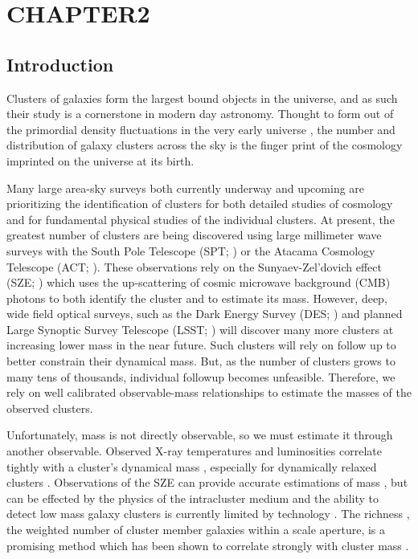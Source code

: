 \renewcommand*{\thefootnote}{\fnsymbol{footnote}}
\chapter[Chapter2]{\uppercase {Chapter2} }
\renewcommand*{\thefootnote}{\arabic{footnote}}
\setcounter{footnote}{0}

\section{Introduction} 
Clusters of galaxies form the largest bound objects in the universe, and as such their study is a cornerstone in modern day astronomy. Thought to form out of the primordial density fluctuations in the very early universe , the number and distribution of galaxy clusters across the sky is the finger print of the cosmology imprinted on the universe at its birth.

Many large area-sky surveys both currently underway and upcoming are prioritizing the identification of clusters for both detailed studies of cosmology and for fundamental physical studies of the individual clusters. At present, the greatest number of clusters are being discovered using large millimeter wave surveys with the South Pole Telescope (SPT; \citealt{Carlstrom2011}) or the Atacama Cosmology Telescope (ACT; \citealt{Swetz2011}). These observations rely on the Sunyaev-Zel'dovich effect (SZE; \citealt{Sunyaev1972}) which uses the up-scattering of cosmic microwave background (CMB) photons to both identify the cluster and to estimate its mass. However, deep, wide field optical surveys, such as the Dark Energy Survey (DES; \citealt{DES2005}) and planned Large Synoptic Survey Telescope (LSST; \citealt{LSST2012}) will discover many more clusters at increasing lower mass in the near future. Such clusters will rely on follow up to better constrain their dynamical mass. But, as the number of clusters grows to many tens of thousands, individual followup becomes unfeasible. Therefore, we rely on well calibrated observable-mass relationships to estimate the masses of the observed clusters.

Unfortunately, mass is not directly observable, so we must estimate it through another observable. Observed X-ray temperatures and luminosities correlate tightly with a cluster's dynamical mass , especially for dynamically relaxed clusters . Observations of the SZE can provide accurate estimations of mass , but can be effected by the physics of the intracluster medium  and the ability to detect low mass galaxy clusters is currently limited by technology . The richness , the weighted number of cluster member galaxies within a scale aperture, is a promising method which has been shown to correlate strongly with cluster mass . 

